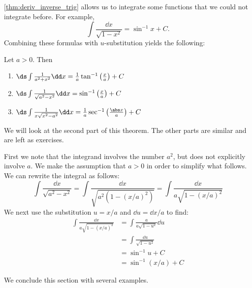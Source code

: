 \autoref{thm:deriv_inverse_trig} allows us to integrate some functions that we could not integrate before. For example,
\[\int\frac{\dd x}{\sqrt{1-x^2}}=\sin^{-1}x+C.\]
Combining these formulas with $u$-substitution yields the following:

{
\begin{theorem}\label{thm:int_inverse_trig}
Let $a>0$.  Then
\begin{enumerate}
	\item	$\ds\int\frac1{a^2+x^2}\dd x=\frac1a\tan^{-1}\left(\frac xa\right) + C$
	\item	$\ds\int\frac1{\sqrt{a^2-x^2}}\dd x=\sin^{-1}\left(\frac xa\right)+C$
	\item	$\ds\int\frac1{x\sqrt{x^2-a^2}}\dd x=\frac1a\sec^{-1}\left(\frac{\abs x}a\right)+C$
\end{enumerate}
\end{theorem}}

We will look at the second part of this theorem. The other parts are similar and are left as exercises.

First we note that the integrand involves the number $a^2$, but does not explicitly involve $a$. We make the assumption that $a>0$ in order to simplify what follows. We can rewrite the integral as follows:
\[\int\frac{\dd x}{\sqrt{a^2-x^2}}=\int\frac{\dd x}{\sqrt{a^2(1-(x/a)^2)}}=\int\frac{\dd x}{a\sqrt{1-(x/a)^2}}\]
We next use the substitution $u=x/a$ and $\dd u=\dd x/a$ to find: 
\begin{align*}
\int\frac{\dd x}{a\sqrt{1-(x/a)^2}}
&=\int\frac{a}{a\sqrt{1-u^2}}\dd u\\
&=\int \frac{\dd u}{\sqrt{1-u^2}}\\
&=\sin^{-1}u+C\\
&=\sin^{-1}(x/a)+C
\end{align*}

We conclude this section with several examples.

